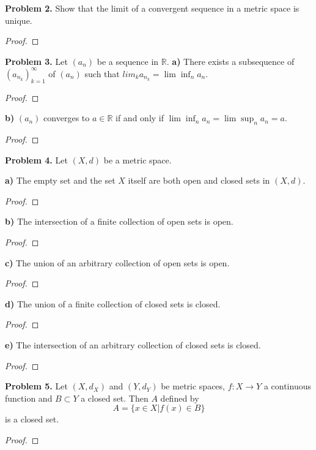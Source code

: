 \documentclass[12pt]{article}
\begin{document}

\textbf{Problem 2.}
Show that the limit of a convergent sequence in a metric space is unique.
\begin{proof}
\end{proof}


\textbf{Problem 3.}
Let $(a_n)$ be a sequence in $\mathbb{R}$.
\textbf{a)}
There exists a subsequence of $(a_{n_k})_{k=1}^{\infty}$ of $(a_n)$
such that $lim_k a_{n_k} = \lim \inf_n a_n$.
\begin{proof}
\end{proof}

\textbf{b)}
$(a_n)$ converges to $a \in \mathbb{R}$ if and only if $\lim \inf_n a_n =
\lim \sup_n a_n = a$.

\begin{proof}
\end{proof}


\textbf{Problem 4.}
Let $(X, d)$ be a metric space.

\textbf{a)}
The empty set and the set $X$ itself are both open and closed sets in $(X,
d).$
\begin{proof}
\end{proof}

\textbf{b)}
The intersection of a finite collection of open sets is open.
\begin{proof}
\end{proof}

\textbf{c)}
The union of an arbitrary collection of open sets is open.
\begin{proof}
\end{proof}

\textbf{d)}
The union of a finite collection of closed sets is closed.
\begin{proof}
\end{proof}

\textbf{e)}
The intersection of an arbitrary collection of closed sets is closed.
\begin{proof}
\end{proof}


\textbf{Problem 5.}
Let $(X, d_X)$ and $(Y, d_Y)$ be metric spaces, $f: X \rightarrow Y$ a
continuous function and $B \subset Y$ a closed set. Then $A$ defined by
\[
    A = \{ x \in X | f(x) \in B \}
\]
is a closed set.
\begin{proof}
\end{proof}
\end{document}
